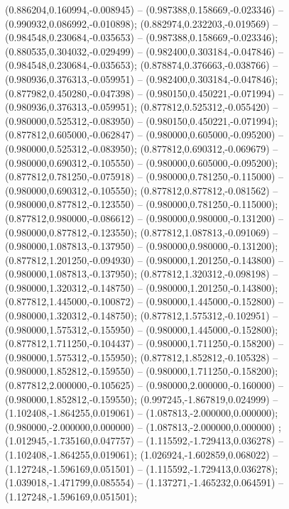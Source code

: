  (0.886204,0.160994,-0.008945) -- (0.987388,0.158669,-0.023346) -- (0.990932,0.086992,-0.010898);
 (0.882974,0.232203,-0.019569) -- (0.984548,0.230684,-0.035653) -- (0.987388,0.158669,-0.023346);
 (0.880535,0.304032,-0.029499) -- (0.982400,0.303184,-0.047846) -- (0.984548,0.230684,-0.035653);
 (0.878874,0.376663,-0.038766) -- (0.980936,0.376313,-0.059951) -- (0.982400,0.303184,-0.047846);
 (0.877982,0.450280,-0.047398) -- (0.980150,0.450221,-0.071994) -- (0.980936,0.376313,-0.059951);
 (0.877812,0.525312,-0.055420) -- (0.980000,0.525312,-0.083950) -- (0.980150,0.450221,-0.071994);
 (0.877812,0.605000,-0.062847) -- (0.980000,0.605000,-0.095200) -- (0.980000,0.525312,-0.083950);
 (0.877812,0.690312,-0.069679) -- (0.980000,0.690312,-0.105550) -- (0.980000,0.605000,-0.095200);
 (0.877812,0.781250,-0.075918) -- (0.980000,0.781250,-0.115000) -- (0.980000,0.690312,-0.105550);
 (0.877812,0.877812,-0.081562) -- (0.980000,0.877812,-0.123550) -- (0.980000,0.781250,-0.115000);
 (0.877812,0.980000,-0.086612) -- (0.980000,0.980000,-0.131200) -- (0.980000,0.877812,-0.123550);
 (0.877812,1.087813,-0.091069) -- (0.980000,1.087813,-0.137950) -- (0.980000,0.980000,-0.131200);
 (0.877812,1.201250,-0.094930) -- (0.980000,1.201250,-0.143800) -- (0.980000,1.087813,-0.137950);
 (0.877812,1.320312,-0.098198) -- (0.980000,1.320312,-0.148750) -- (0.980000,1.201250,-0.143800);
 (0.877812,1.445000,-0.100872) -- (0.980000,1.445000,-0.152800) -- (0.980000,1.320312,-0.148750);
 (0.877812,1.575312,-0.102951) -- (0.980000,1.575312,-0.155950) -- (0.980000,1.445000,-0.152800);
 (0.877812,1.711250,-0.104437) -- (0.980000,1.711250,-0.158200) -- (0.980000,1.575312,-0.155950);
 (0.877812,1.852812,-0.105328) -- (0.980000,1.852812,-0.159550) -- (0.980000,1.711250,-0.158200);
 (0.877812,2.000000,-0.105625) -- (0.980000,2.000000,-0.160000) -- (0.980000,1.852812,-0.159550);
 (0.997245,-1.867819,0.024999) -- (1.102408,-1.864255,0.019061) -- (1.087813,-2.000000,0.000000);
 (0.980000,-2.000000,0.000000) -- (1.087813,-2.000000,0.000000) ;
 (1.012945,-1.735160,0.047757) -- (1.115592,-1.729413,0.036278) -- (1.102408,-1.864255,0.019061);
 (1.026924,-1.602859,0.068022) -- (1.127248,-1.596169,0.051501) -- (1.115592,-1.729413,0.036278);
 (1.039018,-1.471799,0.085554) -- (1.137271,-1.465232,0.064591) -- (1.127248,-1.596169,0.051501);
